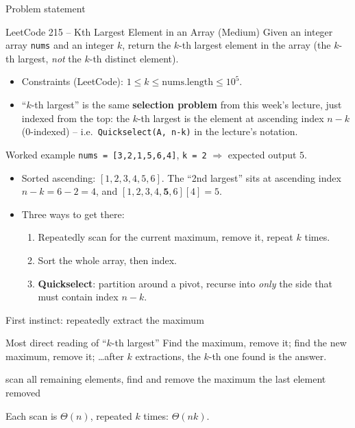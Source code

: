 \documentclass[11pt,aspectratio=169]{beamer}
\begin{document}
\begin{frame}{Problem statement}
  \begin{block}{LeetCode 215 -- Kth Largest Element in an Array (\textcolor{blue!50!black}{Medium})}
    Given an integer array \texttt{nums} and an integer $k$, return the $k$-th largest
    element in the array (the $k$-th largest, \emph{not} the $k$-th distinct element).
  \end{block}
  \begin{itemize}
    \item Constraints (LeetCode): $1 \le k \le \text{nums.length} \le 10^5$.
    \item ``$k$-th largest'' is the same \textbf{selection problem} from this week's
    lecture, just indexed from the top: the $k$-th largest is the element at ascending
    index $n-k$ (0-indexed) -- i.e.\ \texttt{Quickselect(A, n-k)} in the lecture's notation.
  \end{itemize}
\end{frame}

\begin{frame}{Worked example}
  \small
  \texttt{nums = [3,2,1,5,6,4]}, \texttt{k = 2} $\Rightarrow$ expected output $5$.
  \begin{itemize}
    \item Sorted ascending: $[1,2,3,4,5,6]$. The ``2nd largest'' sits at ascending index
    $n-k = 6-2 = 4$, and $[1,2,3,4,\mathbf{5},6][4] = 5$. \checkmark
    \item Three ways to get there:
    \begin{enumerate}
      \item Repeatedly scan for the current maximum, remove it, repeat $k$ times.
      \item Sort the whole array, then index.
      \item \textbf{Quickselect}: partition around a pivot, recurse into \emph{only} the
      side that must contain index $n-k$.
    \end{enumerate}
  \end{itemize}
\end{frame}

\begin{frame}{First instinct: repeatedly extract the maximum}
  \begin{block}{Most direct reading of ``$k$-th largest''}
    Find the maximum, remove it; find the new maximum, remove it; \ldots after $k$
    extractions, the $k$-th one found is the answer.
  \end{block}
  \begin{algorithmic}[1]
      \State scan all remaining elements, find and remove the maximum
    \EndFor
    \State \Return the last element removed
  \end{algorithmic}
  Each scan is $\Theta(n)$, repeated $k$ times: $\Theta(nk)$.
\end{frame}
\end{document}
